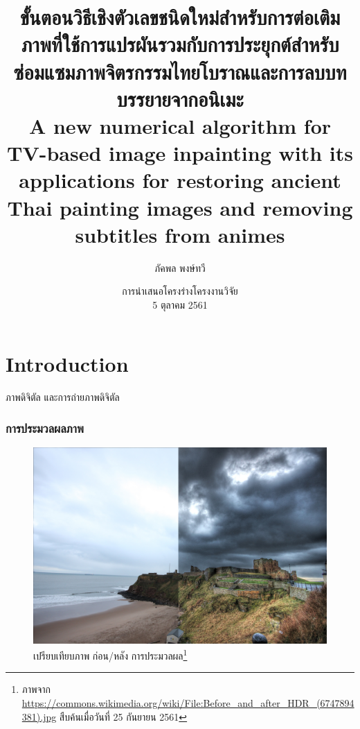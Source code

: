 \documentclass[xcolor=dvipsnames, xetex,serif]{beamer}
\title[วิธีเชิงตัวเลขสำหรับต่อเติมภาพ]{\normalsize{ขั้นตอนวิธีเชิงตัวเลขชนิดใหม่สำหรับการต่อเติมภาพที่ใช้การแปรผันรวมกับการประยุกต์สำหรับซ่อมแซมภาพจิตรกรรมไทยโบราณและการลบบทบรรยายจากอนิเมะ\\A new numerical algorithm for TV-based image inpainting with its applications for restoring ancient Thai painting images and removing subtitles from animes}}
\author[ภัคพล]{ภัคพล พงษ์ทวี}
\institute[SU]{
 	ภาควิชาคณิตศาสตร์\\
 	มหาวิทยาลัยศิลปากร \\}
\date[Project Proposal]{การนำเสนอโครงร่างโครงงานวิจัย\\
 	5 ตุลาคม 2561}
\numberwithin{equation}{section}
\begin{document}
 		\begin{frame}
 			\titlepage 
 		\end{frame}
 		\section{Introduction}
		\begin{frame}
			ภาพดิจิตัล และการถ่ายภาพดิจิตัล
		\end{frame} 		
		\begin{frame}
			\frametitle{การประมวลผลภาพ}
			\begin{figure}[H]
				\centering
				\includegraphics[width=0.6\linewidth]{images/lightroom.jpg}
				\caption{เปรียบเทียบภาพ ก่อน/หลัง การประมวลผล\footnote{ \tiny{ภาพจาก \url{https://commons.wikimedia.org/wiki/File:Before_and_after_HDR_(6747894381).jpg} สืบค้นเมื่อวันที่ 25 กันยายน 2561}}}
				\label{image:lightroom}
			\end{figure}
		\end{frame} 		
\end{document}
